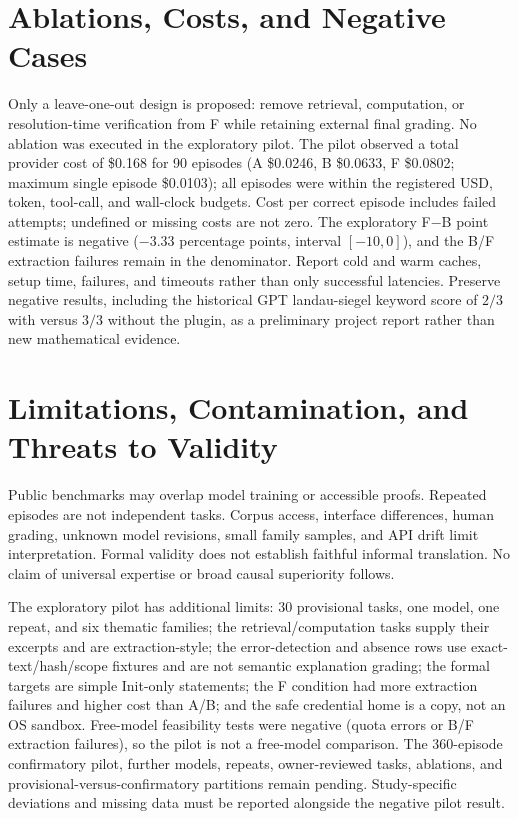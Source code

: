 \documentclass{article}
\begin{document}
\section{Ablations, Costs, and Negative Cases}
Only a leave-one-out design is proposed: remove retrieval, computation, or
resolution-time verification from F while retaining external final grading.
No ablation was executed in the exploratory pilot. The pilot observed a total
provider cost of \$0.168 for 90 episodes (A \$0.0246, B \$0.0633, F \$0.0802;
maximum single episode \$0.0103); all episodes were within the registered USD,
token, tool-call, and wall-clock budgets. Cost per correct episode includes
failed attempts; undefined or missing costs are not zero. The exploratory
F$-$B point estimate is negative ($-3.33$ percentage points, interval
$[-10,0]$), and the B/F extraction failures remain in the denominator. Report
cold and warm caches, setup time, failures, and timeouts rather than only
successful latencies. Preserve negative results, including the historical GPT
landau-siegel keyword score of $2/3$ with versus $3/3$ without the plugin, as a
preliminary project report rather than new mathematical evidence.

\section{Limitations, Contamination, and Threats to Validity}
Public benchmarks may overlap model training or accessible proofs. Repeated
episodes are not independent tasks. Corpus access, interface differences,
human grading, unknown model revisions, small family samples, and API drift
limit interpretation. Formal validity does not establish faithful informal
translation. No claim of universal expertise or broad causal superiority follows.

The exploratory pilot has additional limits: 30 provisional tasks, one model,
one repeat, and six thematic families; the retrieval/computation tasks supply
their excerpts and are extraction-style; the error-detection and absence rows
use exact-text/hash/scope fixtures and are not semantic explanation grading;
the formal targets are simple Init-only statements; the F condition had more
extraction failures and higher cost than A/B; and the safe credential home is a
copy, not an OS sandbox. Free-model feasibility tests were negative (quota
errors or B/F extraction failures), so the pilot is not a free-model
comparison. The 360-episode confirmatory pilot, further models, repeats,
owner-reviewed tasks, ablations, and provisional-versus-confirmatory partitions
remain pending. Study-specific deviations and missing data must be reported
alongside the negative pilot result.
\end{document}
